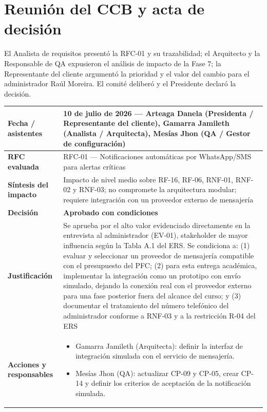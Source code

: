 \documentclass[12pt,a4paper]{article}
\begin{document}
\section{ Reunión del CCB y acta de decisión }

El Analista de requisitos presentó la RFC-01 y su trazabilidad; el Arquitecto y la Responsable de QA expusieron el análisis de impacto de la Fase 7; la Representante del cliente argumentó la prioridad y el valor del cambio para el administrador Raúl Moreira. El comité deliberó y el Presidente declaró la decisión.

\begin{table}[H]
\centering
\begin{tabular}{@{}p{4cm}p{10cm}@{}}
\toprule
\textbf{Fecha / asistentes} & 10 de julio de 2026 --- Arteaga Danela (Presidenta / Representante del cliente), Gamarra Jamileth (Analista / Arquitecta), Mesías Jhon (QA / Gestor de configuración) \\
\midrule
\textbf{RFC evaluada} & RFC-01 --- Notificaciones automáticas por WhatsApp/SMS para alertas críticas \\
\textbf{Síntesis del impacto} & Impacto de nivel medio sobre RF-16, RF-06, RNF-01, RNF-02 y RNF-03; no compromete la arquitectura modular; requiere integración con un proveedor externo de mensajería \\
\textbf{Decisión} & \textbf{Aprobado con condiciones} \\
\textbf{Justificación} & Se aprueba por el alto valor evidenciado directamente en la entrevista al administrador (EV-01), stakeholder de mayor influencia según la Tabla A.1 del ERS. Se condiciona a: (1) evaluar y seleccionar un proveedor de mensajería compatible con el presupuesto del PFC; (2) para esta entrega académica, implementar la integración como un prototipo con envío simulado, dejando la conexión real con el proveedor externo para una fase posterior fuera del alcance del curso; y (3) documentar el tratamiento del número telefónico del administrador conforme a RNF-03 y a la restricción R-04 del ERS \\
\textbf{Acciones y responsables} & 
\begin{itemize}[leftmargin=*,nosep]
    \item Gamarra Jamileth (Arquitecta): definir la interfaz de integración simulada con el servicio de mensajería.
    \item Mesías Jhon (QA): actualizar CP-09 y CP-05, crear CP-14 y definir los criterios de aceptación de la notificación simulada.

\end{itemize}
\end{tabular}
\end{table}
\end{document}
